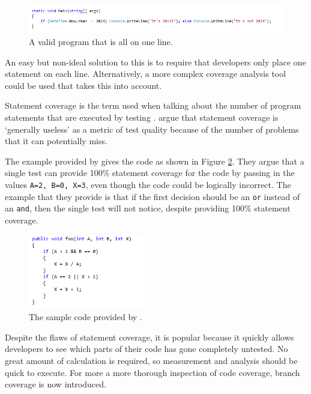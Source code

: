 \begin{figure}
	\begin{center}
		\includegraphics[width=6in]{figures/line_coverage.png}
	\end{center}
\caption{A valid program that is all on one line.}
\label{lineCoverage}
\end{figure}

An easy but non-ideal solution to this is to require that developers only place one statement on each line. Alternatively, a more complex coverage analysis tool could be used that takes this into account.

Statement coverage is the term used when talking about the number of program statements that are executed by testing \citep{Myers:2004:AST:983238}. \citet{Myers:2004:AST:983238} argue that statement coverage is `generally useless' as a metric of test quality because of the number of problems that it can potentially miss.

The example provided by \citet{Myers:2004:AST:983238} gives the code as shown in Figure \ref{codeCoverage}. They argue that a single test can provide 100\% statement coverage for the code by passing in the values \verb+A=2, B=0, X=3+, even though the code could be logically incorrect. The example that they provide is that if the first decision should be an \verb+or+ instead of an \verb+and+, then the single test will not notice, despite providing 100\% statement coverage.

\begin{figure}[h]
	\begin{center}
		\includegraphics[width=2in]{figures/code_coverage.png}
	\end{center}
\caption{The sample code provided by \citet{Myers:2004:AST:983238}.}
\label{codeCoverage}
\end{figure}

Despite the flaws of statement coverage, it is popular because it quickly allows developers to see which parts of their code has gone completely untested. No great amount of calculation is required, so measurement and analysis should be quick to execute. For more a more thorough inspection of code coverage, branch coverage is now introduced.

